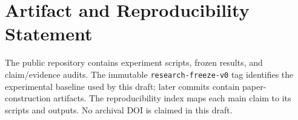 \documentclass[sigconf,nonacm]{acmart}
\begin{document}
\section*{Artifact and Reproducibility Statement}\label{sec:artifact}

The public repository contains experiment scripts, frozen results, and claim/evidence audits. The immutable \texttt{research-freeze-v0} tag identifies the experimental baseline used by this draft; later commits contain paper-construction artifacts. The reproducibility index maps each main claim to its scripts and outputs. No archival DOI is claimed in this draft.
\label{references-start}


\end{document}
